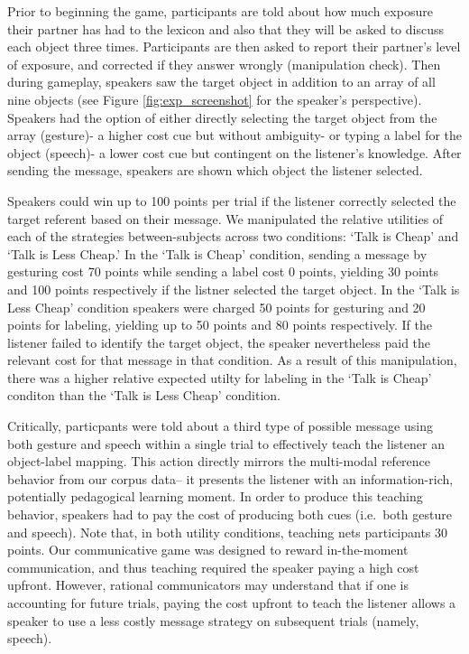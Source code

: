 \documentclass[10pt, letterpaper]{article}
\begin{document}
Prior to beginning the game, participants are told about how much
exposure their partner has had to the lexicon and also that they will be
asked to discuss each object three times. Participants are then asked to
report their partner's level of exposure, and corrected if they answer
wrongly (manipulation check). Then during gameplay, speakers saw the
target object in addition to an array of all nine objects (see Figure
\ref{fig:exp_screenshot} for the speaker's perspective). Speakers had
the option of either directly selecting the target object from the array
(gesture)- a higher cost cue but without ambiguity- or typing a label
for the object (speech)- a lower cost cue but contingent on the
listener's knowledge. After sending the message, speakers are shown
which object the listener selected.

Speakers could win up to 100 points per trial if the listener correctly
selected the target referent based on their message. We manipulated the
relative utilities of each of the strategies between-subjects across two
conditions: `Talk is Cheap' and `Talk is Less Cheap.' In the `Talk is
Cheap' condition, sending a message by gesturing cost 70 points while
sending a label cost 0 points, yielding 30 points and 100 points
respectively if the listner selected the target object. In the `Talk is
Less Cheap' condition speakers were charged 50 points for gesturing and
20 points for labeling, yielding up to 50 points and 80 points
respectively. If the listener failed to identify the target object, the
speaker nevertheless paid the relevant cost for that message in that
condition. As a result of this manipulation, there was a higher relative
expected utilty for labeling in the `Talk is Cheap' conditon than the
`Talk is Less Cheap' condition.

Critically, particpants were told about a third type of possible message
using both gesture and speech within a single trial to effectively teach
the listener an object-label mapping. This action directly mirrors the
multi-modal reference behavior from our corpus data-- it presents the
listener with an information-rich, potentially pedagogical learning
moment. In order to produce this teaching behavior, speakers had to pay
the cost of producing both cues (i.e.~both gesture and speech). Note
that, in both utility conditions, teaching nets participants 30 points.
Our communicative game was designed to reward in-the-moment
communication, and thus teaching required the speaker paying a high cost
upfront. However, rational communicators may understand that if one is
accounting for future trials, paying the cost upfront to teach the
listener allows a speaker to use a less costly message strategy on
subsequent trials (namely, speech).
\end{document}
